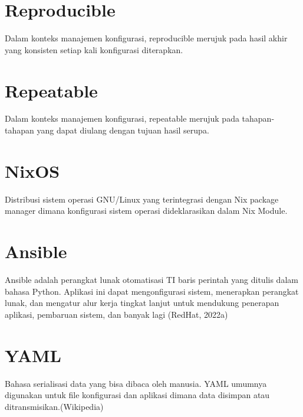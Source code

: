 \documentclass[10pt,]{report}
\begin{document}
\section{Reproducible}
\begin{adjustwidth}{20pt}{}
	\vspace{-3mm}
	Dalam konteks manajemen konfigurasi, reproducible merujuk pada hasil akhir
	yang konsisten setiap kali konfigurasi diterapkan.
\end{adjustwidth}
\section{Repeatable}
\begin{adjustwidth}{20pt}{}
	\vspace{-3mm}
	Dalam konteks manajemen konfigurasi, repeatable merujuk pada tahapan-tahapan
	yang dapat diulang dengan tujuan hasil serupa.
\end{adjustwidth}
\section{NixOS}
\begin{adjustwidth}{20pt}{}
	\vspace{-3mm}
	Distribusi sistem operasi GNU/Linux yang terintegrasi dengan Nix package
	manager dimana konfigurasi sistem operasi dideklarasikan dalam Nix Module.
\end{adjustwidth}
\section{Ansible}
\begin{adjustwidth}{20pt}{}
	\vspace{-3mm}
	Ansible adalah perangkat lunak otomatisasi TI baris perintah yang ditulis dalam
	bahasa Python. Aplikasi ini dapat mengonfigurasi sistem, menerapkan perangkat
	lunak, dan mengatur alur kerja tingkat lanjut untuk mendukung penerapan
	aplikasi, pembaruan sistem, dan banyak lagi (RedHat, 2022a)
\end{adjustwidth}
\section{YAML}
\begin{adjustwidth}{20pt}{}
	\vspace{-3mm}
	Bahasa serialisasi data yang bisa dibaca oleh manusia. YAML umumnya digunakan
	untuk file konfigurasi dan aplikasi dimana data disimpan atau
	ditransmisikan.(Wikipedia)
\end{adjustwidth}
\end{document}
